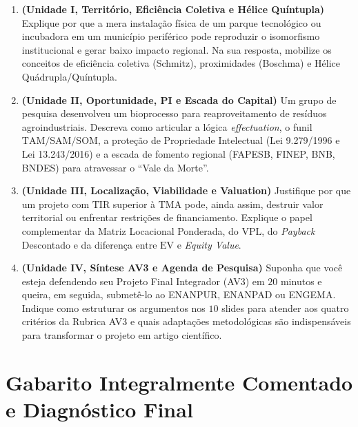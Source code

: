 \begin{enumerate}[leftmargin=1.5em, itemsep=6pt]
  \item \textbf{(Unidade I, Território, Eficiência Coletiva e Hélice Quíntupla)} Explique por que a mera instalação física de um parque tecnológico ou incubadora em um município periférico pode reproduzir o isomorfismo institucional e gerar baixo impacto regional. Na sua resposta, mobilize os conceitos de eficiência coletiva (Schmitz), proximidades (Boschma) e Hélice Quádrupla/Quíntupla.
  \espacoResolucao[3.2cm]

  \item \textbf{(Unidade II, Oportunidade, PI e Escada do Capital)} Um grupo de pesquisa desenvolveu um bioprocesso para reaproveitamento de resíduos agroindustriais. Descreva como articular a lógica \textit{effectuation}, o funil $\text{TAM/SAM/SOM}$, a proteção de Propriedade Intelectual (Lei 9.279/1996 e Lei 13.243/2016) e a escada de fomento regional (FAPESB, FINEP, BNB, BNDES) para atravessar o ``Vale da Morte''.
  \espacoResolucao[3.2cm]

  \item \textbf{(Unidade III, Localização, Viabilidade e Valuation)} Justifique por que um projeto com $\text{TIR}$ superior à $\text{TMA}$ pode, ainda assim, destruir valor territorial ou enfrentar restrições de financiamento. Explique o papel complementar da Matriz Locacional Ponderada, do $\text{VPL}$, do \textit{Payback} Descontado e da diferença entre $\text{EV}$ e \textit{Equity Value}.
  \espacoResolucao[3.2cm]

  \item \textbf{(Unidade IV, Síntese AV3 e Agenda de Pesquisa)} Suponha que você esteja defendendo seu Projeto Final Integrador (AV3) em $20$ minutos e queira, em seguida, submetê-lo ao ENANPUR, ENANPAD ou ENGEMA. Indique como estruturar os argumentos nos $10$ slides para atender aos quatro critérios da Rubrica AV3 e quais adaptações metodológicas são indispensáveis para transformar o projeto em artigo científico.
  \espacoResolucao[3.2cm]
\end{enumerate}

\clearpage
\section*{Gabarito Integralmente Comentado e Diagnóstico Final}

